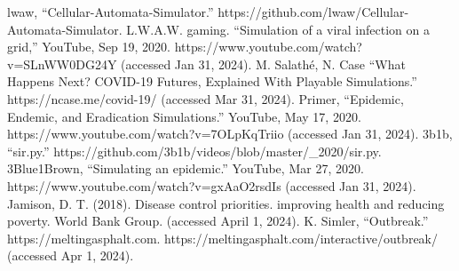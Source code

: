 \documentclass[conference]{IEEEtran}
\begin{document}
\begin{thebibliography}{00}
 lwaw, ``Cellular-Automata-Simulator.'' https://github.com/lwaw/Cellular-Automata-Simulator. 
 L.W.A.W. gaming. ``Simulation of a viral infection on a grid,'' YouTube, Sep 19, 2020. https://www.youtube.com/watch?v=SLnWW0DG24Y (accessed Jan 31, 2024).
 M. Salathé, N. Case ``What Happens Next? COVID-19 Futures, Explained With Playable Simulations.'' https://ncase.me/covid-19/ (accessed Mar 31, 2024).
 Primer, ``Epidemic, Endemic, and Eradication Simulations.'' YouTube, May 17, 2020. https://www.youtube.com/watch?v=7OLpKqTriio (accessed Jan 31, 2024).
 3b1b, ``sir.py.'' https://github.com/3b1b/videos/blob/master/\_2020/sir.py.
 3Blue1Brown, ``Simulating an epidemic.'' YouTube,  Mar 27, 2020. https://www.youtube.com/watch?v=gxAaO2rsdIs (accessed Jan 31, 2024).
 Jamison, D. T. (2018). Disease control priorities. improving health and reducing poverty. World Bank Group. (accessed April 1, 2024).
 K. Simler, ``Outbreak.'' https://meltingasphalt.com. https://meltingasphalt.com/interactive/outbreak/ (accessed Apr 1, 2024). 

\end{thebibliography}
\vspace{12pt}
\color{red}
\end{document}
